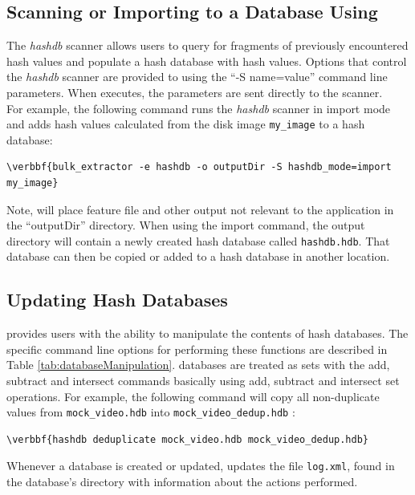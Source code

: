 \documentclass[11pt,fleqn]{article} %
\begin{document}
\subsection{Scanning or Importing to a Database Using \bulk}
\label{bulkextractorSection}
The \bulk \textit{hashdb} scanner allows users to query for fragments of previously encountered hash values and populate a hash database with hash values. Options that control the \textit{hashdb} scanner are provided to \bulk using the ``-S name=value'' command line parameters. When \bulk executes, the parameters are sent directly to the scanner.\\

For example, the following command runs the \bulk \textit{hashdb} scanner in import mode and adds hash values calculated from the disk image \texttt{my\_image} to a hash database:
\begin{Verbatim}[commandchars=\\\{\}]
\verbbf{bulk_extractor -e hashdb -o outputDir -S hashdb_mode=import my_image}
\end{Verbatim}
Note, \bulk will place feature file and other output not relevant to the \hash application in the ``outputDir'' directory. When using the import command, the output directory will contain a newly created hash database called \texttt{hashdb.hdb}. That database can then be copied or added to a hash database in another location.


\subsection{Updating Hash Databases}
\label{updateSection}
\hash provides users with the ability to manipulate the contents of hash databases. The specific command line options for performing these functions are described in Table \ref{tab:databaseManipulation}. \hash databases are treated as sets with the add, subtract and intersect commands basically using add, subtract and intersect set operations. For example, the following command will  copy all non-duplicate values from \texttt{mock\_video.hdb} into \texttt{mock\_video\_dedup.hdb} :
\begin{Verbatim}[commandchars=\\\{\}]
\verbbf{hashdb deduplicate mock_video.hdb mock_video_dedup.hdb}
\end{Verbatim}
Whenever a database is created or updated, \hash updates the file \texttt{log.xml}, found in the database's directory with information about the actions performed.\\
\end{document}
